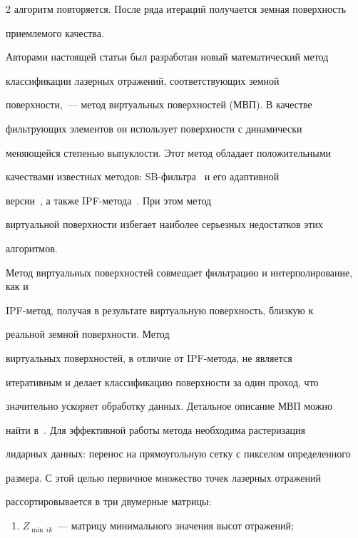 \begin{multicols}{2}
алгоритм повторяется. После ряда итераций получается земная поверхность 

приемлемого качества.

   

   Авторами настоящей статьи был разработан новый математический метод 

классификации лазерных отражений, соответствующих земной 

   поверхности,~--- метод виртуальных поверхностей (МВП). В качестве 

фильтрующих элементов он использует поверхности с динамически 

меняющейся степенью выпуклости. Этот метод обладает положительными 

качествами известных методов: SB-фильтра~\cite{9su} и его адаптивной 

версии~\cite{10su}, а также IPF-метода~\cite{12su}. При этом метод 

виртуальной поверхности избегает наиболее серьезных недостатков этих 

алгоритмов.\linebreak

 Метод виртуальных поверхностей совмещает фильт\-ра\-цию и интерполирование, как и 

   IPF-метод, получая в результате виртуальную поверхность, близкую к 

реальной земной поверхности. Метод\linebreak

 виртуальных поверхностей, в отличие от IPF-ме\-то\-да, не является 

итеративным и делает классификацию поверхности за один проход, что 

значительно ускоряет обработку данных. Детальное описание МВП можно 

найти в~\cite{6su}. Для эффективной работы метода необходима растеризация 

лидарных данных: перенос на прямоугольную сетку с пикселом определенного 

размера. С этой целью первичное множество точек лазерных отражений 

рассортировывается в три двумерные матрицы:

   \begin{enumerate}[(1)]

   \item

   $Z_{\min\,ik}$~--- матрицу минимального значения высот отражений;


\end{enumerate}
\end{multicols}
